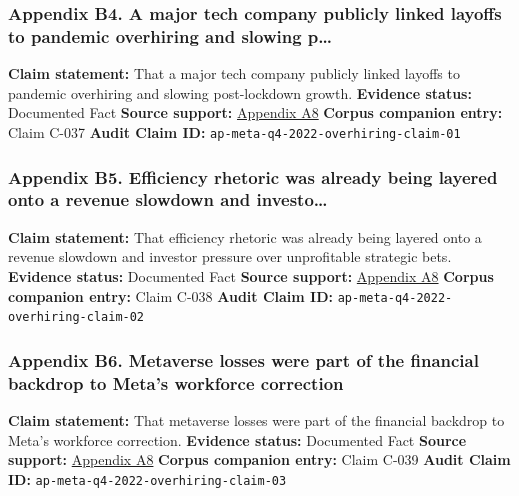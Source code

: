 \documentclass[
  american,
  11pt,
  letterpaper,
]{article}
\begin{document}
\subsubsection{Appendix B4. A major tech company publicly linked layoffs
to pandemic overhiring and slowing
p\ldots{}}\label{ch-05-appendix-b4-a-major-tech-company-publicly-linked-layoffs-to-pandemic-overhiring-and-slowing-p}

\textbf{Claim statement:} That a major tech company publicly linked
layoffs to pandemic overhiring and slowing post-lockdown growth.
\textbf{Evidence status:} Documented Fact \textbf{Source support:}
\hyperref[ch-05-appendix-a8-meta-posts-lower-q4-profit-announces-huge-stock-buyback]{Appendix
A8} \textbf{Corpus companion entry:} Claim C-037 \textbf{Audit Claim
ID:} \texttt{ap-meta-q4-2022-overhiring-claim-01}

\subsubsection{Appendix B5. Efficiency rhetoric was already being
layered onto a revenue slowdown and
investo\ldots{}}\label{ch-05-appendix-b5-efficiency-rhetoric-was-already-being-layered-onto-a-revenue-slowdown-and-investo}

\textbf{Claim statement:} That efficiency rhetoric was already being
layered onto a revenue slowdown and investor pressure over unprofitable
strategic bets. \textbf{Evidence status:} Documented Fact \textbf{Source
support:}
\hyperref[ch-05-appendix-a8-meta-posts-lower-q4-profit-announces-huge-stock-buyback]{Appendix
A8} \textbf{Corpus companion entry:} Claim C-038 \textbf{Audit Claim
ID:} \texttt{ap-meta-q4-2022-overhiring-claim-02}

\subsubsection{Appendix B6. Metaverse losses were part of the financial
backdrop to Meta's workforce
correction}\label{ch-05-appendix-b6-metaverse-losses-were-part-of-the-financial-backdrop-to-meta-s-workforce-correction}

\textbf{Claim statement:} That metaverse losses were part of the
financial backdrop to Meta's workforce correction. \textbf{Evidence
status:} Documented Fact \textbf{Source support:}
\hyperref[ch-05-appendix-a8-meta-posts-lower-q4-profit-announces-huge-stock-buyback]{Appendix
A8} \textbf{Corpus companion entry:} Claim C-039 \textbf{Audit Claim
ID:} \texttt{ap-meta-q4-2022-overhiring-claim-03}
\end{document}

